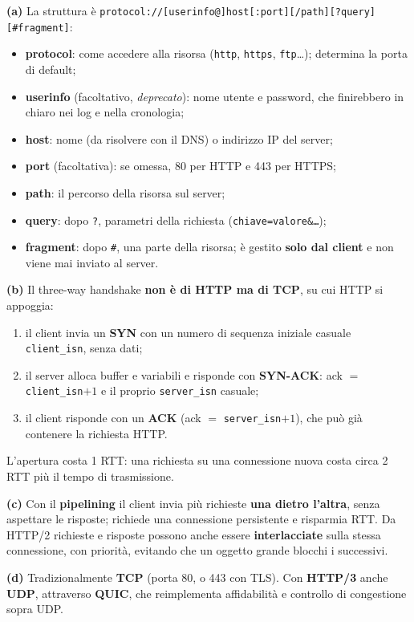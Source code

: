 \svolgimento
\textbf{(a)} La struttura è \texttt{protocol://[userinfo@]host[:port][/path][?query][\#fragment]}:
\begin{itemize}
    \item \textbf{protocol}: come accedere alla risorsa (\texttt{http}, \texttt{https}, \texttt{ftp}\dots); determina la porta di default;
    \item \textbf{userinfo} (facoltativo, \emph{deprecato}): nome utente e password, che finirebbero in chiaro nei log e nella cronologia;
    \item \textbf{host}: nome (da risolvere con il DNS) o indirizzo IP del server;
    \item \textbf{port} (facoltativa): se omessa, 80 per HTTP e 443 per HTTPS;
    \item \textbf{path}: il percorso della risorsa sul server;
    \item \textbf{query}: dopo \texttt{?}, parametri della richiesta (\texttt{chiave=valore\&\dots});
    \item \textbf{fragment}: dopo \texttt{\#}, una parte della risorsa; è gestito \textbf{solo dal client} e non viene mai inviato al server.
\end{itemize}

\textbf{(b)} Il three-way handshake \textbf{non è di HTTP ma di TCP}, su cui HTTP si appoggia:
\begin{enumerate}
    \item il client invia un \textbf{SYN} con un numero di sequenza iniziale casuale \texttt{client\_isn}, senza dati;
    \item il server alloca buffer e variabili e risponde con \textbf{SYN-ACK}: ack $=$ \texttt{client\_isn}$+1$ e il proprio
          \texttt{server\_isn} casuale;
    \item il client risponde con un \textbf{ACK} (ack $=$ \texttt{server\_isn}$+1$), che può già contenere la richiesta HTTP.
\end{enumerate}
L'apertura costa 1 RTT: una richiesta su una connessione nuova costa circa 2 RTT più il tempo di trasmissione.

\textbf{(c)} Con il \textbf{pipelining} il client invia più richieste \textbf{una dietro l'altra}, senza aspettare le risposte;
richiede una connessione persistente e risparmia RTT. Da HTTP/2 richieste e risposte possono anche essere
\textbf{interlacciate} sulla stessa connessione, con priorità, evitando che un oggetto grande blocchi i successivi.

\textbf{(d)} Tradizionalmente \textbf{TCP} (porta 80, o 443 con TLS). Con \textbf{HTTP/3} anche \textbf{UDP}, attraverso
\textbf{QUIC}, che reimplementa affidabilità e controllo di congestione sopra UDP.

